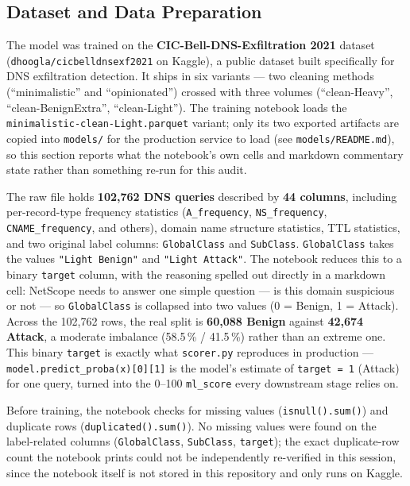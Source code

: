 \subsection*{Dataset and Data Preparation}
The model was trained on the \textbf{CIC-Bell-DNS-Exfiltration 2021}
dataset (\texttt{dhoogla/cicbelldnsexf2021} on Kaggle), a public dataset
built specifically for DNS exfiltration detection. It ships in six variants
--- two cleaning methods (``minimalistic'' and ``opinionated'') crossed with
three volumes (``clean-Heavy'', ``clean-BenignExtra'', ``clean-Light''). The
training notebook loads the \texttt{minimalistic-clean-Light.parquet}
variant; only its two exported artifacts are copied into \texttt{models/}
for the production service to load (see \texttt{models/README.md}), so this
section reports what the notebook's own cells and markdown commentary
state rather than something re-run for this audit.

The raw file holds \textbf{102,762 DNS queries} described by \textbf{44
columns}, including per-record-type frequency statistics
(\texttt{A\_frequency}, \texttt{NS\_frequency}, \texttt{CNAME\_frequency},
and others), domain name structure statistics, TTL statistics, and two
original label columns: \texttt{GlobalClass} and \texttt{SubClass}.
\texttt{GlobalClass} takes the values \texttt{"Light Benign"} and
\texttt{"Light Attack"}. The notebook reduces this to a binary
\texttt{target} column, with the reasoning spelled out directly in a
markdown cell: NetScope needs to answer one simple question --- is this
domain suspicious or not --- so \texttt{GlobalClass} is collapsed into two
values (0 = Benign, 1 = Attack). Across the 102,762 rows, the real split is
\textbf{60,088 Benign} against \textbf{42,674 Attack}, a moderate imbalance
(58.5\,\% / 41.5\,\%) rather than an extreme one. This binary
\texttt{target} is exactly what \texttt{scorer.py} reproduces in
production --- \texttt{model.predict\_proba(x)[0][1]} is the model's
estimate of \texttt{target = 1} (Attack) for one query, turned into the
0--100 \texttt{ml\_score} every downstream stage relies on.

Before training, the notebook checks for missing values
(\texttt{isnull().sum()}) and duplicate rows (\texttt{duplicated().sum()}).
No missing values were found on the label-related columns
(\texttt{GlobalClass}, \texttt{SubClass}, \texttt{target}); the exact
duplicate-row count the notebook prints could not be independently
re-verified in this session, since the notebook itself is not stored in
this repository and only runs on Kaggle.

